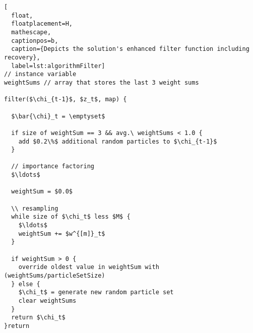 \begin{lstlisting}[
  float,
  floatplacement=H,
  mathescape,
  captionpos=b,
  caption={Depicts the solution's enhanced filter function including recovery},
  label=lst:algorithmFilter]
// instance variable
weightSums // array that stores the last 3 weight sums

filter($\chi_{t-1}$, $z_t$, map) {

  $\bar{\chi}_t = \emptyset$

  if size of weightSum == 3 && avg.\ weightSums < 1.0 {
    add $0.2\%$ additional random particles to $\chi_{t-1}$
  }

  // importance factoring
  $\ldots$

  weightSum = $0.0$

  \\ resampling
  while size of $\chi_t$ less $M$ {
    $\ldots$
    weightSum += $w^{[m]}_t$
  }

  if weightSum > 0 {
    override oldest value in weightSum with (weightSums/particleSetSize)
  } else {
    $\chi_t$ = generate new random particle set
    clear weightSums
  }
  return $\chi_t$
}return\end{lstlisting}
